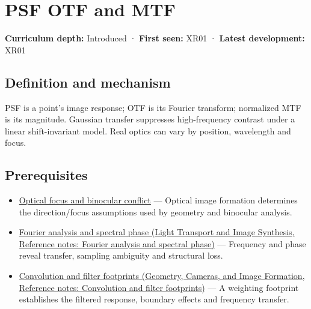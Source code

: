 \hypertarget{appendix-8b76b0efd27f}{}\label{referencestart:appendix-8b76b0efd27f}
\section{PSF OTF and MTF}\label{appendix-8b76b0efd27f-psf-otf-and-mtf}

\textbf{Curriculum depth:} Introduced · \textbf{First seen:} XR01 · \textbf{Latest development:} XR01

\begin{allmightroledefinition}

\subsection{Definition and mechanism}\label{appendix-8b76b0efd27f-definition-and-mechanism}

PSF is a point's image response; OTF is its Fourier transform; normalized MTF is its magnitude. Gaussian transfer suppresses high-frequency contrast under a linear shift-invariant model. Real optics can vary by position, wavelength and focus.

\end{allmightroledefinition}

\subsection{Prerequisites}\label{appendix-8b76b0efd27f-prerequisites}

\begin{itemize}
\tightlist
\item
  \hyperref[appendix-f90cee1be7a4]{Optical focus and binocular conflict} --- Optical image formation determines the direction/focus assumptions used by geometry and binocular analysis.
\item
  \href{../04-Light-Transport-and-Image-Synthesis/main.pdf\#nameddest=appendix-b60686ba06a1}{Fourier analysis and spectral phase (Light Transport and Image Synthesis, Reference notes: Fourier analysis and spectral phase)} --- Frequency and phase reveal transfer, sampling ambiguity and structural loss.
\item
  \href{../03-Geometry-Cameras-and-Image-Formation/main.pdf\#nameddest=appendix-d5b3c692d9f0}{Convolution and filter footprints (Geometry, Cameras, and Image Formation, Reference notes: Convolution and filter footprints)} --- A weighting footprint establishes the filtered response, boundary effects and frequency transfer.
\end{itemize}

